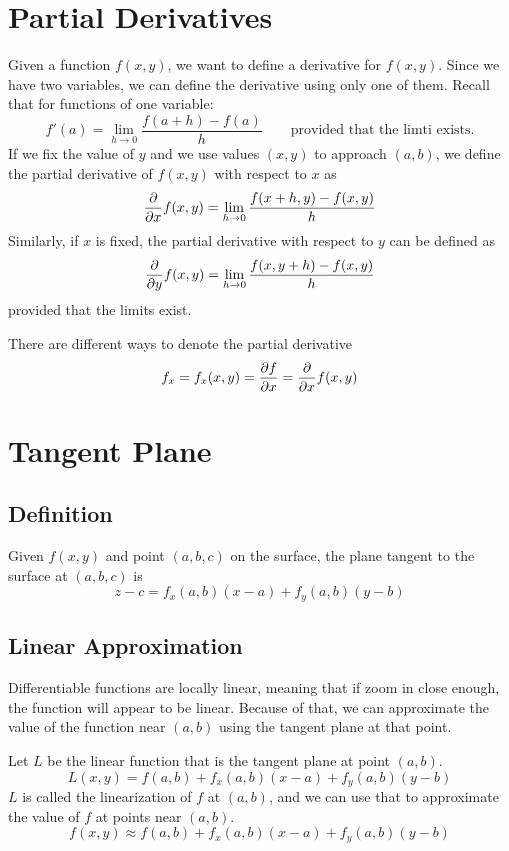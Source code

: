 \section{Partial Derivatives}

\begin{definition}
Given a function $f(x,y)$, we want to define a derivative for $f(x,y)$. Since we have two variables, we can define the derivative using only one of them. Recall that for functions of one variable:
$$
f'(a) = \lim_{h\to 0}{\frac{f(a+h)-f(a)}{h}} \qquad \text{provided that the limti exists.}
$$
If we fix the value of $y$ and we use values $(x,y)$ to approach $(a,b)$, we define the partial derivative of $f(x,y)$ with respect to $x$ as
$$
\frac{\partial }{\partial x} f(x,y) = \lim_{h\to0}\frac{f(x+h,y)-f(x,y)}{h}
$$
Similarly, if $x$ is fixed, the partial derivative with respect to $y$ can be defined as
$$
\frac{\partial }{\partial y} f(x,y) = \lim_{h\to0}\frac{f(x,y+h)-f(x,y)}{h}
$$
provided that the limits exist.
\end{definition}

There are different ways to denote the partial derivative
$$
f_x =   f_x(x,y) = \frac{\partial f}{\partial x} = \frac{\partial }{\partial x}f(x,y)
$$

\section{Tangent Plane}

\subsection{Definition}
Given $f(x,y)$ and point $(a,b,c)$ on the surface, the plane tangent to the surface at $(a,b,c)$ is
$$
z-c = f_x(a,b)(x-a) + f_y(a,b)(y-b)
$$

\subsection{Linear Approximation}
Differentiable functions are locally linear, meaning that if zoom in close enough, the function will appear to be linear. Because of that, we can approximate the value of the function near $(a,b)$ using the tangent plane at that point.

Let $L$ be the linear function that is the tangent plane at point $(a,b)$.
$$
L(x,y) = f(a,b) + f_x(a,b)(x-a) + f_y(a,b)(y-b)
$$
$L$ is called the linearization of $f$ at $(a,b)$, and we can use that to approximate the value of $f$ at points near $(a,b)$.
$$
f(x,y) \approx f(a,b) + f_x(a,b)(x-a) + f_y(a,b)(y-b)
$$

